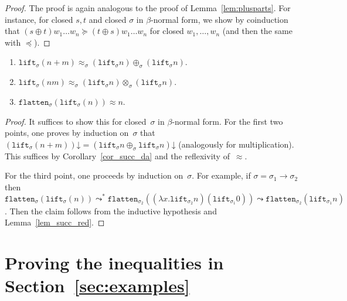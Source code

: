 \documentclass[a4paper,UKenglish,cleveref,autoref,numberwithinsect]{lipics-v2019}
\theoremstyle{definition}
\newcommand{\flatten}{\mathtt{flatten}}
\newcommand{\lift}{\mathtt{lift}}
\newcommand{\refsec}[1]{Section~\ref{sec:#1}}
\newcommand{\da}{\mathord{\downarrow}}
\begin{document}
\begin{proof}
  The proof is again analogous to the proof of
  Lemma~\ref{lem:plusparts}. For instance, for closed $s,t$ and closed
  $\sigma$ in $\beta$-normal form, we show by coinduction that $(s
  \oplus t) w_1 \ldots w_n \succeq (t \oplus s) w_1 \ldots w_n$ for
  closed $w_1,\ldots,w_n$ (and then the same with $\preceq$).
\end{proof}

{ \renewcommand{\thelemma}{\ref{lem_lift_approx}}
\begin{lemma}
  \begin{enumerate}
  \item $\lift_\sigma(n+m) \approx_\sigma (\lift_\sigma n)
    \oplus_\sigma (\lift_\sigma n)$.
  \item $\lift_\sigma(n m) \approx_\sigma (\lift_\sigma n)
    \otimes_\sigma (\lift_\sigma n)$.
  \item $\flatten_\sigma(\lift_\sigma(n)) \approx n$.
  \end{enumerate}
\end{lemma}
\addtocounter{theorem}{-1}}

\begin{proof}
  It suffices to show this for closed~$\sigma$ in $\beta$-normal
  form. For the first two points, one proves by induction on~$\sigma$
  that
  $(\lift_\sigma(n+m))\da = (\lift_\sigma n \oplus_\sigma \lift_\sigma
  n)\da$ (analogously for multiplication). This suffices by
  Corollary~\ref{cor_succ_da} and the reflexivity of~$\approx$.

  For the third point, one proceeds by induction on~$\sigma$. For
  example, if $\sigma = \sigma_1\to\sigma_2$ then
  $\flatten_\sigma(\lift_\sigma(n)) \leadsto^*
  \flatten_{\sigma_2}((\lambda x . \lift_{\sigma_2} n)
  (\lift_{\sigma_1} 0)) \leadsto \flatten_{\sigma_2} (\lift_{\sigma_1}
  n)$. Then the claim follows from the inductive hypothesis and
  Lemma~\ref{lem_succ_red}.
\end{proof}

\clearpage
\section{Proving the inequalities in \refsec{examples}}\label{app_ineqs}
\end{document}
